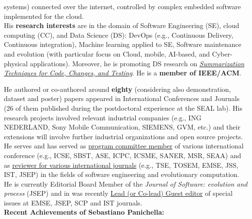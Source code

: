 \documentclass[10pt]{article}
\begin{document}
systems) connected over the internet, controlled by complex embedded software implemented for the cloud.\\
His  \textbf{research interests} are in the domain of Software Engineering (SE), cloud computing (CC), and Data Science (DS): DevOps (e.g., Continuous Delivery, Continuous integration), Machine learning applied to SE, Software maintenance and evolution (with particular focus on Cloud, mobile, AI-based, and Cyber-physical applications). Moreover, he is promoting DS research on \href{https://doi.org/10.1109/VST.2018.8327148}{\textit{Summarization Techniques for Code, Changes, and Testing}}. He is a \textbf{member of IEEE/ACM}. 
\vspace{1mm}

He authored or co-authored around \textbf{eighty} (considering also demonstration, dataset 
  and poster) papers appeared in International Conferences and Journals (26 of them published during the postdoctoral experience at the SEAL lab). His research projects involved relevant industrial companies (e.g., ING NEDERLAND, Sony Mobile Communication, SIEMENS, GVM, etc.) and their extensions will involve further industrial organizations and open source projects. He serves and has served as \href{https://spanichella.github.io/\#services}{program committee member} of various international conference (e.g., ICSE, SBST, ASE, ICPC, ICSME, SANER, MSR, SEAA) and as \href{https://spanichella.github.io/\#services}{reviewer for various international journals} (e.g., TSE, TOSEM, EMSE, JSS, IST, JSEP) in the fields of software engineering and evolutionary computation. He is currently Editorial Board Member of the \textit{Journal of Software: evolution and process} (JSEP) and in was recently \href{https://spanichella.github.io/\#services}{Lead (or Co-lead) Guest editor} of special issues at EMSE, JSEP, SCP and IST journals.\\


\textbf{Recent Achievements of Sebastiano Panichella:}
\end{document}

